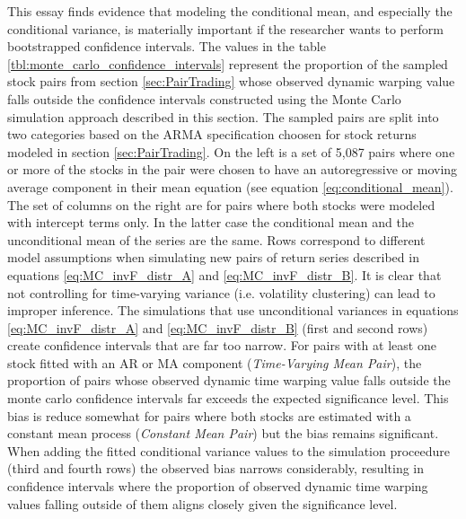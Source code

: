 \documentclass[12pt]{article}
\begin{document}
This essay finds evidence that modeling the conditional mean, and especially the conditional variance, is materially important if the researcher wants to perform bootstrapped confidence intervals. The values in the table \ref{tbl:monte_carlo_confidence_intervals} represent the proportion of the sampled stock pairs from section \ref{sec:PairTrading} whose observed dynamic warping value falls outside the confidence intervals constructed using the Monte Carlo simulation approach described in this section. The sampled pairs are split into two categories based on the ARMA specification choosen for stock returns modeled in section \ref{sec:PairTrading}. On the left is a set of 5,087 pairs where one or more of the stocks in the pair were chosen to have an autoregressive or moving average component in their mean equation (see equation \ref{eq:conditional_mean}). The set of columns on the right are for pairs where both stocks were modeled with intercept terms only. In the latter case the conditional mean and the unconditional mean of the series are the same. Rows correspond to different model assumptions when simulating new pairs of return series described in equations \ref{eq:MC_invF_distr_A} and \ref{eq:MC_invF_distr_B}. It is clear that not controlling for time-varying variance (i.e. volatility clustering) can lead to improper inference. The simulations that use unconditional variances in equations \ref{eq:MC_invF_distr_A} and \ref{eq:MC_invF_distr_B} (first and second rows) create confidence intervals that are far too narrow. For pairs with at least one stock fitted with an AR or MA component (\textit{Time-Varying Mean Pair}), the proportion of pairs whose observed dynamic time warping value falls outside the monte carlo confidence intervals far exceeds the expected significance level. This bias is reduce somewhat for pairs where both stocks are estimated with a constant mean process (\textit{Constant Mean Pair}) but the bias remains significant. When adding the fitted conditional variance values to the simulation proceedure (third and fourth rows) the observed bias narrows considerably, resulting in confidence intervals where the proportion of observed dynamic time warping values falling outside of them aligns closely given the significance level. 
\end{document}
